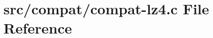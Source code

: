 \hypertarget{compat-lz4_8c}{}\section{src/compat/compat-\/lz4.c File Reference}
\label{compat-lz4_8c}

